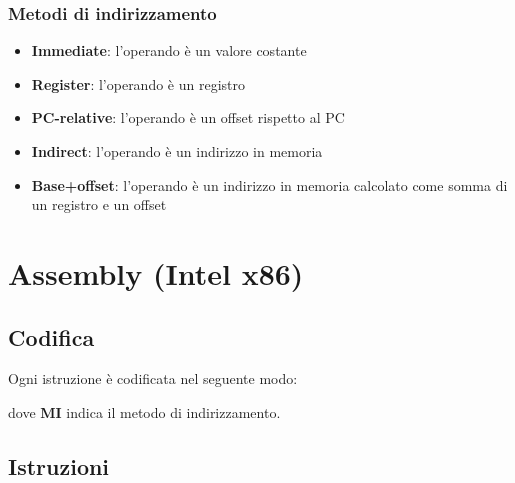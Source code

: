 \documentclass[a4paper]{article}
\theoremstyle{break}
\theoremstyle{break}
\theoremstyle{break}
\theoremstyle{break}
\begin{document}
\subsubsection{Metodi di indirizzamento}
\begin{itemize}
	\item \textbf{Immediate}: l'operando è un valore costante
	\item \textbf{Register}: l'operando è un registro
	\item \textbf{PC-relative}: l'operando è un offset rispetto al PC
	\item \textbf{Indirect}: l'operando è un indirizzo in memoria
	\item \textbf{Base+offset}: l'operando è un indirizzo in memoria calcolato come somma di un registro e un offset
\end{itemize}

\section{Assembly (Intel x86)}
\subsection{Codifica}
Ogni istruzione è codificata nel seguente modo:

\begin{figure}[H]
	\centering
\end{figure}

\noindent dove \textbf{MI} indica il metodo di indirizzamento.

\subsection{Istruzioni}
\end{document}
